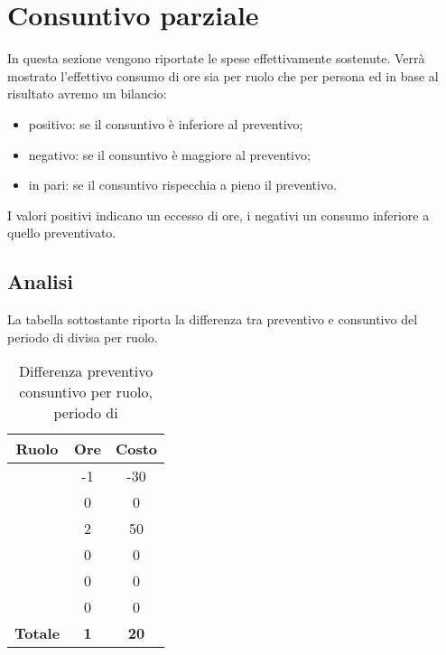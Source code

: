 \section{Consuntivo parziale}
In questa sezione vengono riportate le spese effettivamente sostenute. Verrà mostrato l'effettivo consumo di ore sia per ruolo che per persona ed in base al risultato avremo un bilancio:
\begin{itemize}
	\item positivo: se il consuntivo è inferiore al preventivo;
	\item negativo: se il consuntivo è maggiore al preventivo;
	\item in pari: se il consuntivo rispecchia a pieno il preventivo.
\end{itemize}
I valori positivi indicano un eccesso di ore, i negativi un consumo inferiore a quello preventivato.

\subsection{Analisi}
La tabella sottostante riporta la differenza tra preventivo e consuntivo del periodo di \AR{} divisa per ruolo.
\begin{table}[H]
	\centering
	\begin{tabular}{|c|c|c|}
		\hline
		\textbf{Ruolo} &
		\textbf{Ore} &
		\textbf{Costo} \\
		\hline
		\Responsabile & -1 & -30\\
		\hline
		\Amministratore & 0 & 0\\
		\hline
		\Analista & 2 & 50\\
		\hline
		\Progettista & 0 & 0 \\
		\hline
		\Verificatore & 0 & 0\\
		\hline
		\Programmatore & 0 & 0 \\
		\hline
		\textbf{Totale} & \textbf{1} & \textbf{20} \\
		\hline
	\end{tabular}
	\caption{Differenza preventivo consuntivo per ruolo, periodo di \AR}
\end{table}

